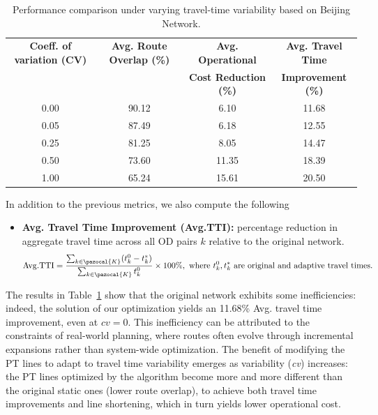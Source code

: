 \documentclass[a4paper,fleqn]{cas-sc}
\begin{document}
\begin{table}[t]
\centering
\small
\begin{threeparttable}
    \setlength{\tabcolsep}{12pt} 
    \renewcommand{\arraystretch}{1.25}

    \begin{tabular}{c c c c}
    \toprule
    \textbf{Coeff. of variation (CV)} & \textbf{Avg. Route Overlap (\%)} & \textbf{Avg. Operational} & \textbf{Avg. Travel Time } 
    \\
    && \textbf{Cost Reduction (\%)} & \textbf{Improvement (\%)}
    \\
    \midrule
    0.00 & 90.12 & 6.10  & 11.68  \\
    0.05 & 87.49 & 6.18  & 12.55  \\
    0.25 & 81.25 & 8.05  & 14.47 \\
    0.50 & 73.60 & 11.35 & 18.39  \\
    1.00 & 65.24 & 15.61 & 20.50 \\
    \bottomrule
    \end{tabular}
    
\end{threeparttable}
\caption{Performance comparison under varying travel-time variability based on Beijing Network.}
\label{tab:routes_comparison}
\end{table}

In addition to the previous metrics, we also compute the following
\begin{itemize}
    \item \textbf{Avg. Travel Time Improvement (Avg.TTI):} percentage reduction in aggregate travel time across all OD pairs $k$ relative to the original network.
    \begin{align}
        \mathrm{Avg. TTI} = \frac{\sum_{k \in \pazocal{K}} (t_k^0 - t_k^*)}{\sum_{k \in \pazocal{K}} t_k^0} \times 100\%, \text{ where } t_k^0, t_k^* \text{ are original and adaptive travel times.}
    \end{align}
\end{itemize}
%
The results in Table~\ref{tab:routes_comparison} show that the original network exhibits some inefficiencies: indeed, the solution of our optimization yields an 11.68\% Avg. travel time improvement, even at $cv = 0$. This inefficiency can be attributed to the constraints of real-world planning, where routes often evolve through incremental expansions rather than system-wide optimization. 
%
The benefit of modifying the PT lines to adapt to travel time variability emerges as variability (\textit{cv}) increases: the PT lines optimized by the algorithm become more and more different than the original static ones (lower route overlap), to achieve both travel time improvements and line shortening, which in turn yields lower operational cost. 
\end{document}
